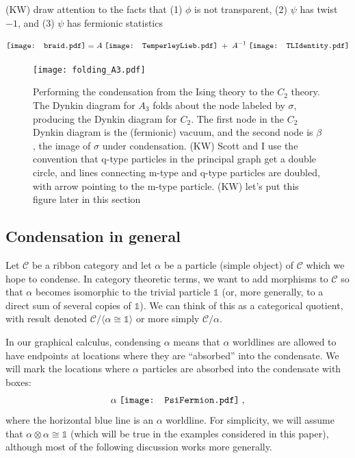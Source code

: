 \documentclass[12pt,a4paper]{article}
\newcounter{arrow}
\newcommand{\unit}{\mathds{1}}
\newcommand{\mcc}{\mathcal{C}}
\newcommand{\kw}[1]{{\color{kwcolor}\footnotesize{(KW) #1}}}
\newcommand{\PsiFermion}{\mathord{\vcenter{\hbox{\texttt{[image: PsiFermion.pdf]}}}}}
\begin{document}
\medskip

\kw{draw attention to the facts that (1) $\phi$ is not transparent, (2) $\psi$ has twist $-1$, 
and (3) $\psi$ has fermionic statistics}






\newcommand{\braid}{\mathord{\vcenter{\hbox{\texttt{[image: braid.pdf]}}}}}
\newcommand{\TLIdentity}{\mathord{\vcenter{\hbox{\texttt{[image: TLIdentity.pdf]}}}}}
\newcommand{\TemperleyLieb}{\mathord{\vcenter{\hbox{\texttt{[image: TemperleyLieb.pdf]}}}}}
  
\begin{align}
\braid = A\;  \TemperleyLieb \; +\;  A^{-1}\;  \TLIdentity
\end{align}

\begin{figure}
\texttt{[image: folding\_A3.pdf]}
\caption{Performing the condensation from the Ising theory to the $C_2$ theory. The Dynkin diagram for $A_3$ folds about the node labeled by $\sigma$, producing the Dynkin diagram 
for $C_2$. The first node in the $C_2$ Dynkin diagram is the (fermionic) vacuum, and the second node is $\beta$, the image of $\sigma$ under condensation.
\kw{Scott and I use the convention that q-type particles in the principal graph get a double circle, and lines connecting
m-type and q-type particles are doubled, with arrow pointing to the m-type particle.}
\kw{let's put this figure later in this section}
} 
\end{figure}



\subsection{Condensation in general}

Let $\mcc$ be a ribbon category and let $\alpha$ be a particle (simple object) of $\mcc$ which we hope to condense.
In category theoretic terms, we want to add morphisms to $\mcc$ so that $\alpha$ becomes
isomorphic to the trivial particle $\unit$ (or, more generally, to a direct sum of several copies of $\unit$). 
We can think of this as a categorical quotient, with result denoted $\mcc/\langle \alpha \cong \unit \rangle$ or
more simply $\mcc/\alpha$.

In our graphical calculus, condensing $\alpha$ means that $\alpha$ worldlines are allowed to have endpoints at locations where they are ``absorbed'' into the condensate. 
We will mark the locations where $\alpha$ particles are absorbed into the condensate with boxes:
\begin{align}
\label{box_def}
\alpha\; \PsiFermion\; , 
\end{align}
where the horizontal blue line is an $\alpha$ worldline. 
For simplicity, we will assume that $\alpha\otimes\alpha\cong \unit$ (which will be true in the examples considered in this paper), 
although most of the following discussion works more generally.
\end{document}
